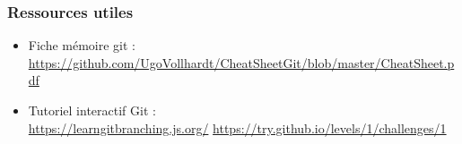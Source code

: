 \documentclass{beamer}
\begin{document}
\begin{frame}
\frametitle{Ressources utiles}
\begin{itemize}
	\item Fiche mémoire git : \\
	\url{https://github.com/UgoVollhardt/CheatSheetGit/blob/master/CheatSheet.pdf}
	\item Tutoriel interactif Git : \\
	\url{https://learngitbranching.js.org/}
	\url{https://try.github.io/levels/1/challenges/1}
\end{itemize}


\end{frame}
\end{document}
